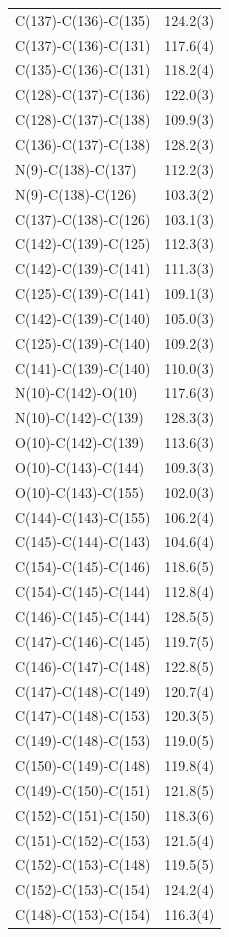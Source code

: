 \begin{center}
{\begin{supertabular}{p{1.5in}c}
C(137)-C(136)-C(135)&124.2(3)\\
C(137)-C(136)-C(131)&117.6(4)\\
C(135)-C(136)-C(131)&118.2(4)\\
C(128)-C(137)-C(136)&122.0(3)\\
C(128)-C(137)-C(138)&109.9(3)\\
C(136)-C(137)-C(138)&128.2(3)\\
N(9)-C(138)-C(137)&112.2(3)\\
N(9)-C(138)-C(126)&103.3(2)\\
C(137)-C(138)-C(126)&103.1(3)\\
C(142)-C(139)-C(125)&112.3(3)\\
C(142)-C(139)-C(141)&111.3(3)\\
C(125)-C(139)-C(141)&109.1(3)\\
C(142)-C(139)-C(140)&105.0(3)\\
C(125)-C(139)-C(140)&109.2(3)\\
C(141)-C(139)-C(140)&110.0(3)\\
N(10)-C(142)-O(10)&117.6(3)\\
N(10)-C(142)-C(139)&128.3(3)\\
O(10)-C(142)-C(139)&113.6(3)\\
O(10)-C(143)-C(144)&109.3(3)\\
O(10)-C(143)-C(155)&102.0(3)\\
C(144)-C(143)-C(155)&106.2(4)\\
C(145)-C(144)-C(143)&104.6(4)\\
C(154)-C(145)-C(146)&118.6(5)\\
C(154)-C(145)-C(144)&112.8(4)\\
C(146)-C(145)-C(144)&128.5(5)\\
C(147)-C(146)-C(145)&119.7(5)\\
C(146)-C(147)-C(148)&122.8(5)\\
C(147)-C(148)-C(149)&120.7(4)\\
C(147)-C(148)-C(153)&120.3(5)\\
C(149)-C(148)-C(153)&119.0(5)\\
C(150)-C(149)-C(148)&119.8(4)\\
C(149)-C(150)-C(151)&121.8(5)\\
C(152)-C(151)-C(150)&118.3(6)\\
C(151)-C(152)-C(153)&121.5(4)\\
C(152)-C(153)-C(148)&119.5(5)\\
C(152)-C(153)-C(154)&124.2(4)\\
C(148)-C(153)-C(154)&116.3(4)\\

\end{supertabular}}
\end{center}
